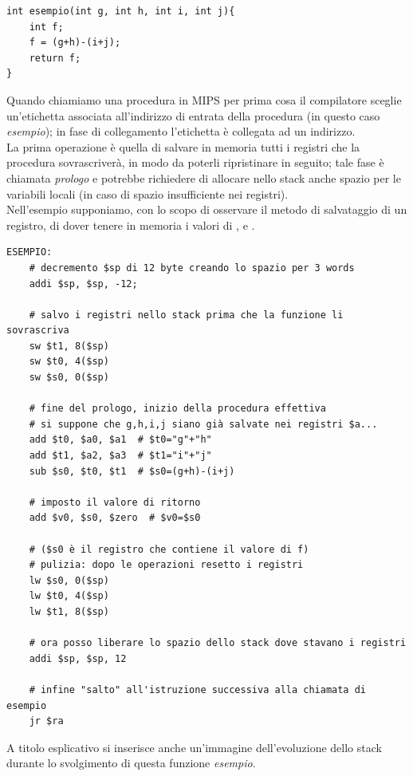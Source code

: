 \documentclass[class=book, crop=false, oneside]{standalone}
\begin{document}
\begin{verbatim}
int esempio(int g, int h, int i, int j){
	int f;
	f = (g+h)-(i+j);
	return f;
}
\end{verbatim}

Quando chiamiamo una procedura in MIPS per prima cosa il compilatore sceglie un’etichetta associata all’indirizzo di entrata della procedura (in questo caso \emph{esempio}); in fase di collegamento l'etichetta è collegata ad un indirizzo.\\
La prima operazione è quella di salvare in memoria tutti i registri che la procedura sovrascriverà, in modo da poterli ripristinare in seguito; tale fase è chiamata \emph{prologo} e potrebbe richiedere di allocare nello stack anche spazio per le variabili locali (in caso di spazio insufficiente nei registri).\\
Nell'esempio supponiamo, con lo scopo di osservare il metodo di salvataggio di un registro, di dover tenere in memoria i valori di ,  e .

\begin{verbatim}
ESEMPIO:
	# decremento $sp di 12 byte creando lo spazio per 3 words
	addi $sp, $sp, -12;

	# salvo i registri nello stack prima che la funzione li sovrascriva
	sw $t1, 8($sp)
	sw $t0, 4($sp)
	sw $s0, 0($sp)

	# fine del prologo, inizio della procedura effettiva
	# si suppone che g,h,i,j siano già salvate nei registri $a...
	add $t0, $a0, $a1  # $t0="g"+"h"
	add $t1, $a2, $a3  # $t1="i"+"j"
	sub $s0, $t0, $t1  # $s0=(g+h)-(i+j)

	# imposto il valore di ritorno
	add $v0, $s0, $zero  # $v0=$s0

	# ($s0 è il registro che contiene il valore di f)
	# pulizia: dopo le operazioni resetto i registri
	lw $s0, 0($sp)
	lw $t0, 4($sp)
	lw $t1, 8($sp)

	# ora posso liberare lo spazio dello stack dove stavano i registri
	addi $sp, $sp, 12

	# infine "salto" all'istruzione successiva alla chiamata di esempio
	jr $ra
\end{verbatim}

A titolo esplicativo si inserisce anche un'immagine dell'evoluzione dello stack durante lo svolgimento di questa funzione \emph{esempio}.
\end{document}

